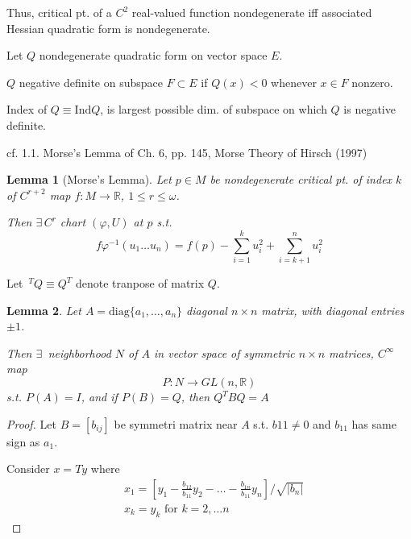 \documentclass[10pt]{amsart}
\newtheorem{lemma}{Lemma}
\begin{document}
\begin{multicols*}{2}
Thus, critical pt. of a $C^2$ real-valued function nondegenerate iff associated Hessian quadratic form is nondegenerate.  

Let $Q$ nondegenerate quadratic form on vector space $E$.

$Q$ negative definite on subspace $F \subset E$ if $Q(x)<0$ whenever $x\in F$ nonzero.

Index of $Q \equiv \text{Ind}Q$, is largest possible dim. of subspace on which $Q$ is negative definite.








cf. 1.1. Morse's Lemma of  Ch. 6, pp. 145, Morse Theory of Hirsch (1997) \cite{MHirsch1997}

\begin{lemma}[Morse's Lemma]
  Let $p\in M$ be nondegenerate critical pt. of index $k$ of $C^{r+2}$ map $f:M\to \mathbb{R}$, $1\leq r \leq \omega$.

  Then $\exists \, C^r$ chart $(\varphi,U)$ at $p$ s.t.
  \begin{equation}
    f\varphi^{-1}(u_1 \dots u_n) = f(p) - \sum_{i=1}^k u_i^2 + \sum_{i = k+1}^n u_i^2
  \end{equation}
  \end{lemma}

Let ${\,}^TQ \equiv Q^T$ denote tranpose of matrix $Q$.

\begin{lemma}
  Let $A = \text{diag}\lbrace a_1 , \dots , a_n \rbrace$ diagonal $n\times n$ matrix, with diagonal entries $\pm 1$.

  Then $\exists \, $ neighborhood $N$ of $A$ in vector space of symmetric $n\times n$ matrices, $C^{\infty}$ map
  \begin{equation}
P:N \to GL(n,\mathbb{R})
  \end{equation}
  s.t. $P(A)=I$, and if $P(B) = Q$, then $Q^T BQ = A$
\end{lemma}

\begin{proof}
  Let $B = [b_{ij}]$ be symmetri matrix near $A$ s.t. $b{11} \neq 0$ and $b_{11}$ has same sign as $a_1$.

    Consider $x=Ty$ where
    \[
\begin{aligned}
&  x_1 = \left[ y_1 - \frac{b_{12}}{b_{11}} y_2 - \dots - \frac{b_{1n}}{b_{11}} y_n \right] / \sqrt{ |b_n | } \\ 
& x_k = y_k \text{ for } k = 2, \dots n 
  \end{aligned}
    \]
  \end{proof}



\end{multicols*}
\end{document}
